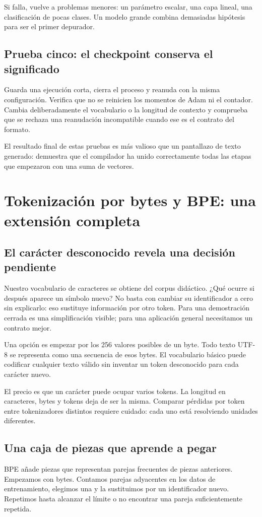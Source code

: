 \documentclass[12pt,a4paper,oneside]{report}
\begin{document}
Si falla, vuelve a problemas menores: un parámetro escalar, una capa lineal, una clasificación de pocas clases. Un modelo grande combina demasiadas hipótesis para ser el primer depurador.

\section{Prueba cinco: el checkpoint conserva el significado}
Guarda una ejecución corta, cierra el proceso y reanuda con la misma configuración. Verifica que no se reinicien los momentos de Adam ni el contador. Cambia deliberadamente el vocabulario o la longitud de contexto y comprueba que se rechaza una reanudación incompatible cuando ese es el contrato del formato.

El resultado final de estas pruebas es más valioso que un pantallazo de texto generado: demuestra que el compilador ha unido correctamente todas las etapas que empezaron con una suma de vectores.


\chapter{Tokenización por bytes y BPE: una extensión completa}
\label{ch:bpe}
\section{El carácter desconocido revela una decisión pendiente}
Nuestro vocabulario de caracteres se obtiene del corpus didáctico. ¿Qué ocurre si después aparece un símbolo nuevo? No basta con cambiar su identificador a cero sin explicarlo: eso sustituye información por otro token. Para una demostración cerrada es una simplificación visible; para una aplicación general necesitamos un contrato mejor.

Una opción es empezar por los 256 valores posibles de un byte. Todo texto UTF-8 se representa como una secuencia de esos bytes. El vocabulario básico puede codificar cualquier texto válido sin inventar un token desconocido para cada carácter nuevo.

El precio es que un carácter puede ocupar varios tokens. La longitud en caracteres, bytes y tokens deja de ser la misma. Comparar pérdidas por token entre tokenizadores distintos requiere cuidado: cada uno está resolviendo unidades diferentes.

\section{Una caja de piezas que aprende a pegar}
BPE añade piezas que representan parejas frecuentes de piezas anteriores. Empezamos con bytes. Contamos parejas adyacentes en los datos de entrenamiento, elegimos una y la sustituimos por un identificador nuevo. Repetimos hasta alcanzar el límite o no encontrar una pareja suficientemente repetida.
\end{document}

